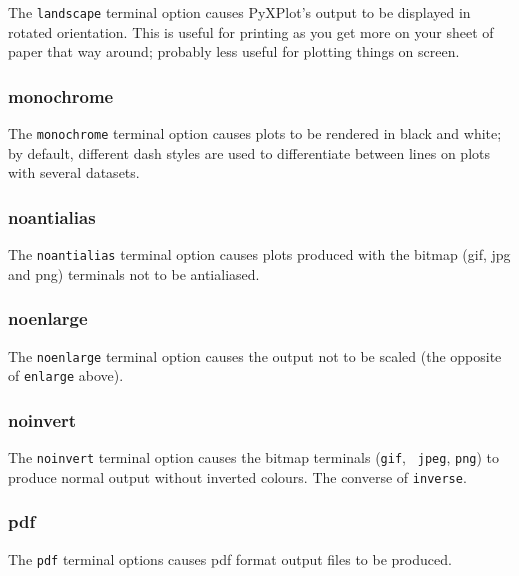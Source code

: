 The {\tt landscape} terminal option causes PyXPlot's output to be displayed in
rotated orientation.  This is useful for printing as you get more on your sheet
of paper that way around; probably less useful for plotting things on screen.

\subsubsection{monochrome}

The {\tt monochrome} terminal option causes plots to be rendered in black and
white; by default, different dash styles are used to differentiate between
lines on plots with several datasets.

\subsubsection{noantialias}

The {\tt noantialias} terminal option causes plots produced with the bitmap
(gif, jpg and png) terminals not to be antialiased.

\subsubsection{noenlarge}

The {\tt noenlarge} terminal option causes the output not to be scaled (the
opposite of {\tt enlarge} above).

\subsubsection{noinvert}

The {\tt noinvert} terminal option causes the bitmap terminals ({\tt gif}, {\tt
jpeg}, {\tt png}) to produce normal output without inverted colours. The
converse of {\tt inverse}.


\subsubsection{pdf}

The {\tt pdf} terminal options causes pdf format output files to be produced.

